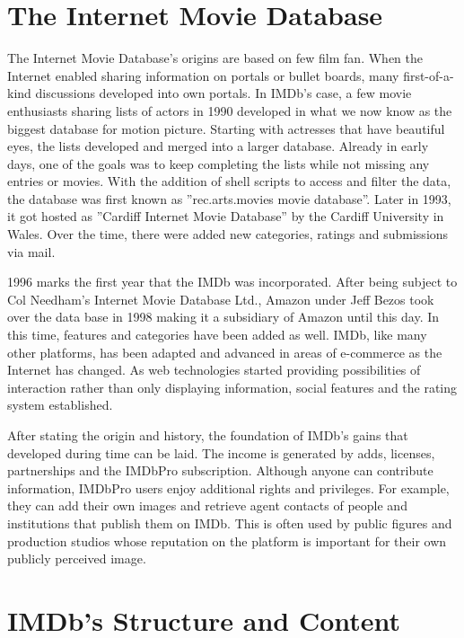 \section{The Internet Movie Database}

The Internet Movie Database's origins are based on few film fan. When the Internet enabled sharing information on portals or bullet boards, many first-of-a-kind discussions developed into own portals. In IMDb's case, a few movie enthusiasts sharing lists of actors in 1990 developed in what we now know as the biggest database for motion picture. Starting with actresses that have beautiful eyes, the lists developed and merged into a larger database. Already in early days, one of the goals was to keep completing the lists while not missing any entries or movies. With the addition of shell scripts to access and filter the data, the database was first known as ''rec.arts.movies movie database''. Later in 1993, it got hosted as ''Cardiff Internet Movie Database'' by the Cardiff University in Wales. Over the time, there were added new categories, ratings and submissions via mail. 

1996 marks the first year that the IMDb was incorporated. After being subject to Col Needham's Internet Movie Database Ltd., Amazon under Jeff Bezos took over the data base in 1998 making it a subsidiary of Amazon until this day. In this time, features and categories have been added as well. IMDb, like many other platforms, has been adapted and advanced in areas of e-commerce as the Internet has changed. As web technologies started providing possibilities of interaction rather than only displaying information, social features and the rating system established.

After stating the origin and history, the foundation of IMDb's gains that developed during time can be laid. The income is generated by adds, licenses, partnerships and the IMDbPro subscription. Although anyone can contribute information, IMDbPro users enjoy additional rights and privileges. For example, they can add their own images and retrieve agent contacts of people and institutions that publish them on IMDb. This is often used by public figures and production studios whose reputation on the platform is important for their own publicly perceived image.  

\section{IMDb's Structure and Content}

